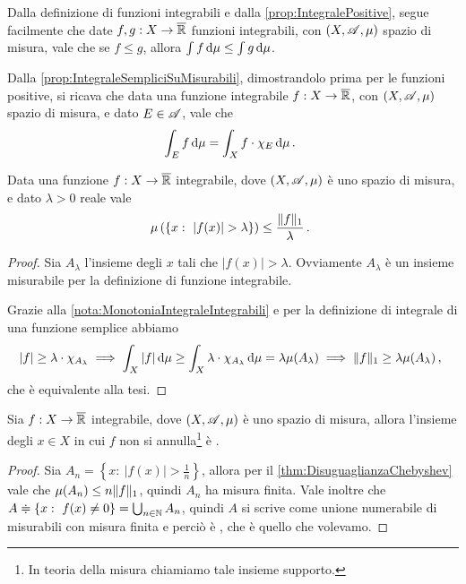 \begin{remark}\label{nota:MonotoniaIntegraleIntegrabili}
	Dalla definizione di funzioni integrabili e dalla \cref{prop:IntegralePositive}, segue facilmente che date $f,g:X\to\overline{\mathbb R}$ funzioni integrabili, con $(X,\mathscr A,\mu)$ spazio di misura, vale che se $f\le g$, allora $\int f\,\mathrm d\mu\le \int g\,\mathrm d\mu$.
\end{remark}

\begin{remark}\label{nota:IntegraleIntegrabiliSuMisurabili}
	Dalla \cref{prop:IntegraleSempliciSuMisurabili}, dimostrandolo prima per le funzioni positive, si ricava che data una funzione integrabile $f:X\to\overline{\mathbb R}$, con $(X,\mathscr A,\mu)$ spazio di misura, e dato $E\in\mathscr A$, vale che
	\begin{equation*}
		\int_E f \,\mathrm d\mu=\int_X f\cdot\chi_E\,\mathrm d\mu\, \text{. }
	\end{equation*}

\end{remark}



\begin{theorem}\label{thm:DisuguaglianzaChebyshev}
	Data una funzione $f:X\to\overline{\mathbb R}$ integrabile, dove $(X,\mathscr A,\mu)$ è uno spazio di misura, e dato $\lambda>0$ reale vale
	\begin{equation*}
		\mu\left(\left\{x:\ |f(x)|>\lambda\right\}\right) \le \frac{\LNorm f}{\lambda}\punto
	\end{equation*}
\end{theorem}
\begin{proof}
	Sia $A_\lambda$ l'insieme degli $x$ tali che $|f(x)|>\lambda$. Ovviamente $A_\lambda$ è un insieme misurabile per la definizione di funzione integrabile.
	
	Grazie alla \cref{nota:MonotoniaIntegraleIntegrabili} e per la definizione di integrale di una funzione semplice abbiamo
	\begin{equation*}
		|f|\ge\lambda \cdot \chi_{A_\lambda} \implies \int_X |f|\,\mathrm d\mu \ge \int_X \lambda\cdot\chi_{A_\lambda}\,\mathrm d\mu=\lambda\mu(A_\lambda)\implies
		\Vert f\Vert_1\ge \lambda\mu(A_\lambda)\, \text{, }
	\end{equation*}
	che è equivalente alla tesi.
\end{proof}

\begin{corollary}\label{cor:SupportoIntegrabile}
	Sia $f:X\to\overline{\mathbb R}$ integrabile, dove $(X,\mathscr A,\mu)$ è uno spazio di misura, allora l'insieme degli $x\in X$ in cui $f$ non si annulla\footnote{In teoria della misura chiamiamo tale insieme supporto.} è \sigfin[o].
\end{corollary}
\begin{proof}
	Sia $A_n=\left\{x:\ |f(x)|>\frac 1n \right\}$, allora per il \cref{thm:DisuguaglianzaChebyshev} vale che $\mu(A_n)\le n \Vert f\Vert_1$, quindi $A_n$ ha misura finita. Vale inoltre che $A\doteqdot\left\{x:\ f(x)\not=0 \right\}=\bigcup_{n\in\mathbb N}A_n$, quindi $A$ si scrive come unione numerabile di misurabili con misura finita e perciò è \sigfin[o], che è quello che volevamo.
\end{proof}



